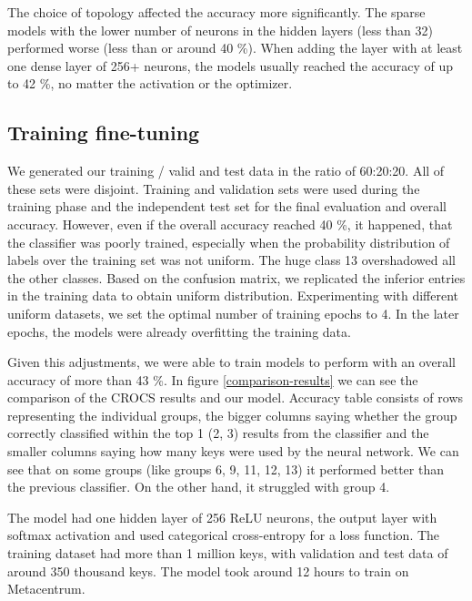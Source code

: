 The choice of topology affected the accuracy more significantly. The sparse models with the lower number of neurons in the hidden layers (less than 32) performed worse (less than or around 40 \%). When adding the layer with at least one dense layer of 256+ neurons, the models usually reached the accuracy of up to 42 \%, no matter the activation or the optimizer.

\subsection*{Training fine-tuning}

We generated our training / valid and test data in the ratio of 60:20:20. All of these sets were disjoint. Training and validation sets were used during the training phase and the independent test set for the final evaluation and overall accuracy. However, even if the overall accuracy reached 40 \%, it happened, that the classifier was poorly trained, especially when the probability distribution of labels over the training set was not uniform. The huge class 13 overshadowed all the other classes. Based on the confusion matrix, we replicated the inferior entries in the training data to obtain uniform distribution. Experimenting with different uniform datasets, we set the optimal number of training epochs to 4. In the later epochs, the models were already overfitting the training data.

Given this adjustments, we were able to train models to perform with an overall accuracy of more than 43 \%. In figure \ref{comparison-results} we can see the comparison of the CROCS results and our model. Accuracy table consists of rows representing the individual groups, the bigger columns saying whether the group correctly classified within the top 1 (2, 3) results from the classifier and the smaller columns saying how many keys were used by the neural network. We can see that on some groups (like groups 6, 9, 11, 12, 13) it performed better than the previous classifier. On the other hand, it struggled with group 4.

The model had one hidden layer of 256 ReLU neurons, the output layer with softmax activation and used categorical cross-entropy for a loss function. The training dataset had more than 1 million keys, with validation and test data of around 350 thousand keys. The model took around 12 hours to train on Metacentrum.

